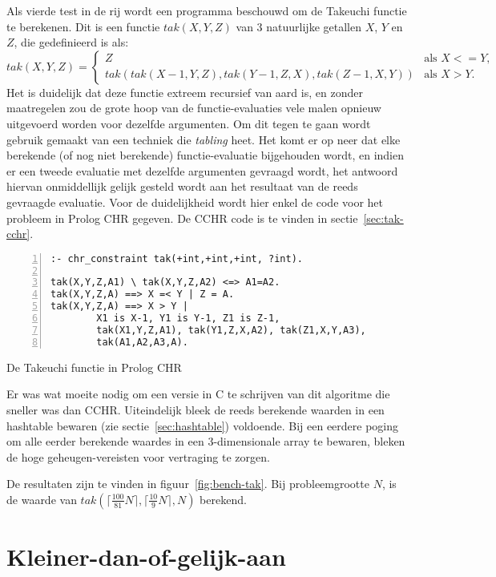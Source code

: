 Als vierde test in de rij wordt een programma beschouwd om de Takeuchi functie te berekenen. Dit is een functie $tak(X,Y,Z)$ van 3 natuurlijke getallen $X$, $Y$ en $Z$, die gedefinieerd is als:
\begin{equation*}
tak(X,Y,Z) = 
\begin{cases} 
  Z & \text{als $X <= Y$,} \\
  tak(tak(X-1,Y,Z),tak(Y-1,Z,X),tak(Z-1,X,Y)) & \text{als $X > Y$.}
\end{cases}
\end{equation*}
Het is duidelijk dat deze functie extreem recursief van aard is, en zonder maatregelen zou de grote hoop van de functie-evaluaties vele malen opnieuw uitgevoerd worden voor dezelfde argumenten. Om dit tegen te gaan wordt gebruik gemaakt van een techniek die {\em tabling} heet. Het komt er op neer dat elke berekende (of nog niet berekende) functie-evaluatie bijgehouden wordt, en indien er een tweede evaluatie met dezelfde argumenten gevraagd wordt, het antwoord hiervan onmiddellijk gelijk gesteld wordt aan het resultaat van de reeds gevraagde evaluatie. Voor de  duidelijkheid wordt hier enkel de code voor het probleem in Prolog CHR gegeven. De CCHR code is te vinden in sectie~\ref{sec:tak-cchr}.
\begin{exCode}
\begin{Verbatim}[frame=single,numbers=left]
:- chr_constraint tak(+int,+int,+int, ?int).

tak(X,Y,Z,A1) \ tak(X,Y,Z,A2) <=> A1=A2.
tak(X,Y,Z,A) ==> X =< Y | Z = A.
tak(X,Y,Z,A) ==> X > Y | 
        X1 is X-1, Y1 is Y-1, Z1 is Z-1,
        tak(X1,Y,Z,A1), tak(Y1,Z,X,A2), tak(Z1,X,Y,A3),
        tak(A1,A2,A3,A).
\end{Verbatim}
\caption{\label{code:tak} De Takeuchi functie in Prolog CHR}
\end{exCode}
Er was wat moeite nodig om een versie in C te schrijven van dit algoritme die sneller was dan CCHR. Uiteindelijk bleek de reeds berekende waarden in een hashtable bewaren (zie sectie~\ref{sec:hashtable}) voldoende. Bij een eerdere poging om alle eerder berekende waardes in een 3-dimensionale array te bewaren, bleken de hoge geheugen-vereisten voor vertraging te zorgen.

De resultaten zijn te vinden in figuur~\ref{fig:bench-tak}. Bij probleemgrootte $N$, is de waarde van $tak(\lceil\frac{100}{81}N\rceil,\lceil\frac{10}{9}N\rceil,N)$ berekend.

\section{Kleiner-dan-of-gelijk-aan} \label{sec:bench-leq}

